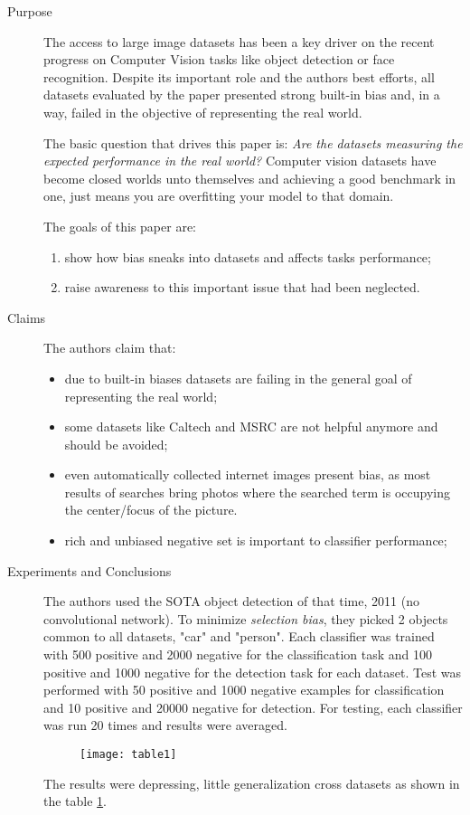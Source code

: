 \documentclass[
10pt, %
a4paper, %
onecolumn, %
]{article}
\begin{document}
\begin{description}
\item[Purpose] The access to large image datasets has been a key driver on the recent progress on Computer Vision tasks like object detection or face recognition. Despite its important role and the authors best efforts, all datasets evaluated by the paper presented strong built-in bias and, in a way, failed in the objective of representing the real world. 

The basic question that drives this paper is: \textit{Are the datasets measuring the expected performance in the real world?} Computer vision datasets have become closed worlds unto themselves and achieving a good benchmark in one, just means you are overfitting your model to that domain. 

The goals of this paper are:
\begin{enumerate}
    \item show how bias sneaks into datasets and affects tasks performance;
    \item raise awareness to this important issue that had been neglected.
\end{enumerate}


\item[Claims] The authors claim that: 
\begin{itemize}
\item due to built-in biases datasets are failing in the general goal of representing the real world;
\item some datasets like Caltech and MSRC are not helpful anymore and should be avoided;
\item even automatically collected internet images present bias, as most results of searches bring photos where the searched term is occupying the center/focus of the picture. 
\item rich and unbiased negative set is important to classifier performance;

\end{itemize}
\item[Experiments and Conclusions] The authors used the SOTA object detection of that time, 2011 (no convolutional network).  To minimize \textit{selection bias}, they picked 2 objects common to all datasets, "car" and "person". Each classifier was trained with 500 positive and 2000 negative for the classification task and 100 positive and 1000 negative for the detection task for each dataset. Test was performed with 50 positive and 1000 negative examples for classification and 10 positive and 20000 negative for detection. For testing, each classifier was run 20 times and results were averaged.
\begin{figure}[!htp]
    \centering
    \texttt{[image: table1]}
    \label{table1}
\end{figure}
The results were depressing, little generalization cross datasets as shown in the table \ref{table1}.


\end{description}
\end{document}
